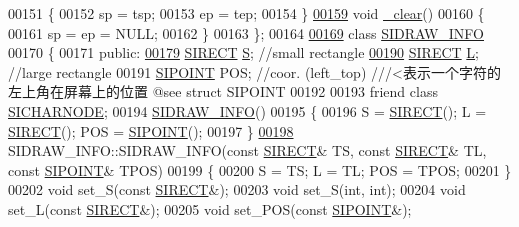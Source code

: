\begin{DoxyCode}
00151     \{
00152         sp = tsp;
00153         ep = tep;
00154     \}
\hyperlink{struct_s_i_r_a_n_g_e_afa57adc9093ce9213bedf4bb4c74310a}{00159}     \textcolor{keywordtype}{void} \hyperlink{struct_s_i_r_a_n_g_e_afa57adc9093ce9213bedf4bb4c74310a}{\_clear}()
00160     \{
00161         sp = ep = NULL;
00162     \}
00163 \};
00164 
\hyperlink{class_s_i_d_r_a_w___i_n_f_o}{00169} \textcolor{keyword}{class }\hyperlink{class_s_i_d_r_a_w___i_n_f_o}{SIDRAW\_INFO}
00170 \{
00171 \textcolor{keyword}{public}:
\hyperlink{class_s_i_d_r_a_w___i_n_f_o_a495fac5bcc54e4b58d500a7117fde9d9}{00179}     \hyperlink{struct_s_i_r_e_c_t}{SIRECT} \hyperlink{class_s_i_d_r_a_w___i_n_f_o_a495fac5bcc54e4b58d500a7117fde9d9}{S};        \textcolor{comment}{//small rectangle   }
\hyperlink{class_s_i_d_r_a_w___i_n_f_o_a41065961d296d245790773771670aae2}{00190} \textcolor{comment}{}    \hyperlink{struct_s_i_r_e_c_t}{SIRECT} \hyperlink{class_s_i_d_r_a_w___i_n_f_o_a41065961d296d245790773771670aae2}{L};        \textcolor{comment}{//large rectangle   }
00191     \hyperlink{struct_s_i_p_o_i_n_t}{SIPOINT} POS; \textcolor{comment}{//coor. (left\_top)  ///<表示一个字符的左上角在屏幕上的位置 @see struct SIPOINT}
00192 
00193     \textcolor{keyword}{friend} \textcolor{keyword}{class }\hyperlink{class_s_i_c_h_a_r_n_o_d_e}{SICHARNODE};
00194     \hyperlink{class_s_i_d_r_a_w___i_n_f_o}{SIDRAW\_INFO}()    
00195     \{
00196         S = \hyperlink{struct_s_i_r_e_c_t}{SIRECT}(); L = \hyperlink{struct_s_i_r_e_c_t}{SIRECT}(); POS = \hyperlink{struct_s_i_p_o_i_n_t}{SIPOINT}();
00197     \}
\hyperlink{class_s_i_d_r_a_w___i_n_f_o_a48107d70e4071d1d925f722085876c3a}{00198}     SIDRAW\_INFO::SIDRAW\_INFO(\textcolor{keyword}{const} \hyperlink{struct_s_i_r_e_c_t}{SIRECT}& TS, \textcolor{keyword}{const} \hyperlink{struct_s_i_r_e_c_t}{SIRECT}& TL, \textcolor{keyword}{const} 
      \hyperlink{struct_s_i_p_o_i_n_t}{SIPOINT}& TPOS)   
00199     \{
00200         S = TS; L = TL; POS = TPOS;
00201     \}   
00202     \textcolor{keywordtype}{void} set\_S(\textcolor{keyword}{const} \hyperlink{struct_s_i_r_e_c_t}{SIRECT}&);    
00203     \textcolor{keywordtype}{void} set\_S(\textcolor{keywordtype}{int}, \textcolor{keywordtype}{int});   
00204     \textcolor{keywordtype}{void} set\_L(\textcolor{keyword}{const} \hyperlink{struct_s_i_r_e_c_t}{SIRECT}&);    
00205     \textcolor{keywordtype}{void} set\_POS(\textcolor{keyword}{const} \hyperlink{struct_s_i_p_o_i_n_t}{SIPOINT}&);    

\end{DoxyCode}

